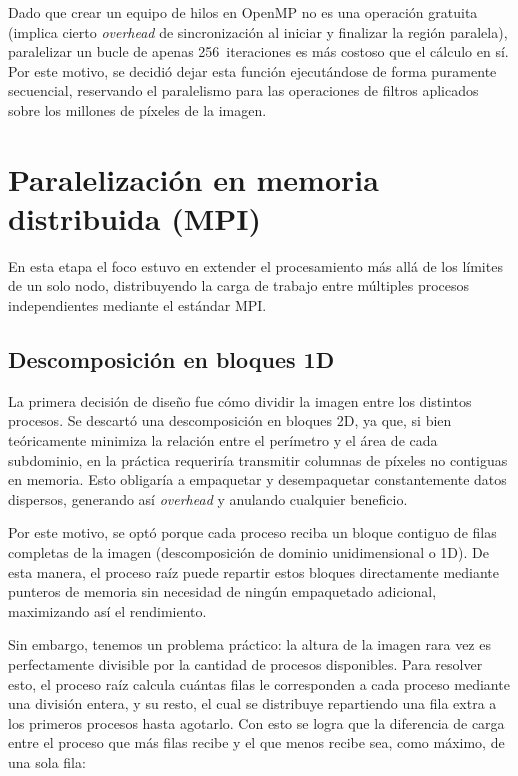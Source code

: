 Dado que crear un equipo de hilos en OpenMP no es una operación gratuita (implica cierto \textit{overhead} de sincronización al iniciar y finalizar la región paralela), paralelizar un bucle de apenas 256~iteraciones es más costoso que el cálculo en sí. Por este motivo, se decidió dejar esta función ejecutándose de forma puramente secuencial, reservando el paralelismo para las operaciones de filtros aplicados sobre los millones de píxeles de la imagen.


\section{Paralelización en memoria distribuida (MPI)}

En esta etapa el foco estuvo en extender el procesamiento más allá de los límites de un solo nodo, distribuyendo la carga de trabajo entre múltiples procesos independientes mediante el estándar MPI.


\subsection{Descomposición en bloques 1D}

La primera decisión de diseño fue cómo dividir la imagen entre los distintos procesos. Se descartó una descomposición en bloques 2D, ya que, si bien teóricamente minimiza la relación entre el perímetro y el área de cada subdominio, en la práctica requeriría transmitir columnas de píxeles no contiguas en memoria. Esto obligaría a empaquetar y desempaquetar constantemente datos dispersos, generando así \textit{overhead} y anulando cualquier beneficio.

Por este motivo, se optó porque cada proceso reciba un bloque contiguo de filas completas de la imagen (descomposición de dominio unidimensional o 1D). De esta manera, el proceso raíz puede repartir estos bloques directamente mediante punteros de memoria sin necesidad de ningún empaquetado adicional, maximizando así el rendimiento.

Sin embargo, tenemos un problema práctico: la altura de la imagen rara vez es perfectamente divisible por la cantidad de procesos disponibles. Para resolver esto, el proceso raíz calcula cuántas filas le corresponden a cada proceso mediante una división entera, y su resto, el cual se distribuye repartiendo una fila extra a los primeros procesos hasta agotarlo. Con esto se logra que la diferencia de carga entre el proceso que más filas recibe y el que menos recibe sea, como máximo, de una sola fila:

